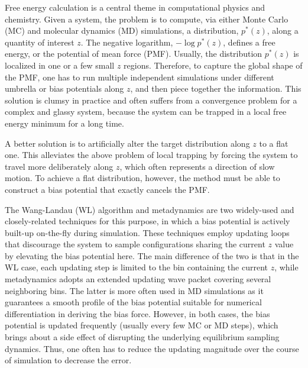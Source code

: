 \documentclass[reprint, floatfix]{revtex4-1}
\begin{document}
Free energy calculation\cite{frenkel, newman} is a central theme
in computational physics and chemistry.
%
Given a system,
the problem is to compute,
via either Monte Carlo\cite{frenkel, newman, landau_binder} (MC)
and molecular dynamics\cite{frenkel, karplus2002} (MD) simulations,
a distribution, $p^*(z)$,
along a quantity of interest $z$.
%
The negative logarithm,
$-\log p^*(z)$,
defines a free energy,
or the potential of mean force (PMF).
%
Usually, the distribution $p^*(z)$ is
localized in one or a few small $z$ regions.
%
Therefore, to capture the global shape
of the PMF,
one has to run multiple independent simulations
under different umbrella or bias potentials
along $z$\cite{mezei1987, berg1992, lee1993},
and then piece together the information.
%
This solution is clumsy in practice
and often suffers from a convergence problem
for a complex and glassy system,
because the system can be trapped
in a local free energy minimum
for a long time.



A better solution is to artificially alter
the target distribution along $z$
to a flat one\cite{mezei1987, berg1992, lee1993,
wang2001, wang2001pre, laio2002, laio2008, barducci2011, sutto2012}.
%
This alleviates the above problem of local trapping
by forcing the system to travel more
deliberately along $z$,
which often represents
a direction of slow motion.
%
To achieve a flat distribution, however,
the method must be able to construct a
bias potential that exactly cancels the PMF.



The Wang-Landau (WL) algorithm\cite{wang2001, wang2001pre}
and meta\-dy\-nam\-ics\cite{huber1994, laio2002,
laio2008, barducci2011, sutto2012}
are two widely-used and closely-related\cite{micheletti2004}
techniques for this purpose,
in which a bias potential is actively built-up on-the-fly
during simulation.
%
These techniques employ updating loops
that discourage the system
to sample configurations
sharing the current $z$ value
by elevating the bias potential here.
%
The main difference of the two
is that in the WL case,
each updating step is limited to the bin
containing the current $z$,
while metadynamics adopts an extended
updating wave packet
covering several neighboring bins.
%
The latter is more often used in MD simulations
as it guarantees a smooth profile
of the bias potential
suitable for numerical differentiation
in deriving the bias force.
%
However, in both cases, the bias potential
is updated frequently (usually every few MC or MD steps),
which brings about a side effect
of disrupting the underlying
equilibrium sampling dynamics\cite{laio2002}.
%
Thus, one often has to reduce
the updating magnitude
over the course of simulation
to decrease the error.
\end{document}
